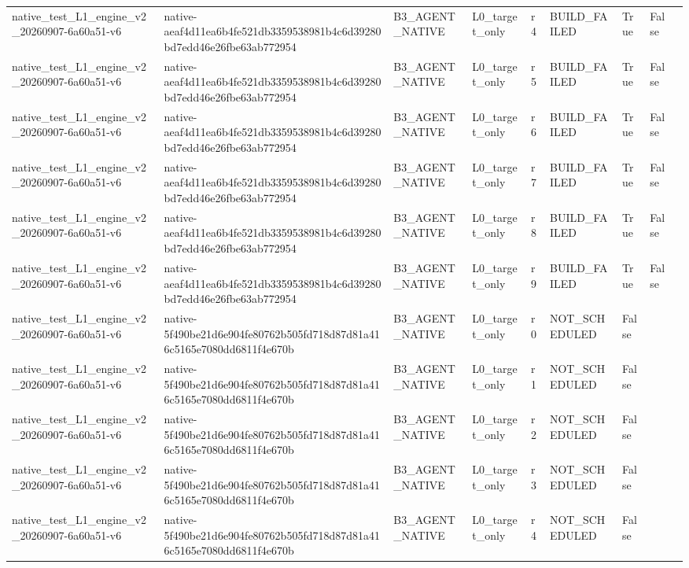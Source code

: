 \begin{tabular}{lllllllll}
native\_test\_L1\_engine\_v2\_20260907-6a60a51-v6 & native-aeaf4d11ea6b4fe521db3359538981b4c6d39280bd7edd46e26fbe63ab772954 & B3\_AGENT\_NATIVE & L0\_target\_only & r4 & BUILD\_FAILED & True & False &  \\
native\_test\_L1\_engine\_v2\_20260907-6a60a51-v6 & native-aeaf4d11ea6b4fe521db3359538981b4c6d39280bd7edd46e26fbe63ab772954 & B3\_AGENT\_NATIVE & L0\_target\_only & r5 & BUILD\_FAILED & True & False &  \\
native\_test\_L1\_engine\_v2\_20260907-6a60a51-v6 & native-aeaf4d11ea6b4fe521db3359538981b4c6d39280bd7edd46e26fbe63ab772954 & B3\_AGENT\_NATIVE & L0\_target\_only & r6 & BUILD\_FAILED & True & False &  \\
native\_test\_L1\_engine\_v2\_20260907-6a60a51-v6 & native-aeaf4d11ea6b4fe521db3359538981b4c6d39280bd7edd46e26fbe63ab772954 & B3\_AGENT\_NATIVE & L0\_target\_only & r7 & BUILD\_FAILED & True & False &  \\
native\_test\_L1\_engine\_v2\_20260907-6a60a51-v6 & native-aeaf4d11ea6b4fe521db3359538981b4c6d39280bd7edd46e26fbe63ab772954 & B3\_AGENT\_NATIVE & L0\_target\_only & r8 & BUILD\_FAILED & True & False &  \\
native\_test\_L1\_engine\_v2\_20260907-6a60a51-v6 & native-aeaf4d11ea6b4fe521db3359538981b4c6d39280bd7edd46e26fbe63ab772954 & B3\_AGENT\_NATIVE & L0\_target\_only & r9 & BUILD\_FAILED & True & False &  \\
native\_test\_L1\_engine\_v2\_20260907-6a60a51-v6 & native-5f490be21d6e904fe80762b505fd718d87d81a416c5165e7080dd6811f4e670b & B3\_AGENT\_NATIVE & L0\_target\_only & r0 & NOT\_SCHEDULED & False &  &  \\
native\_test\_L1\_engine\_v2\_20260907-6a60a51-v6 & native-5f490be21d6e904fe80762b505fd718d87d81a416c5165e7080dd6811f4e670b & B3\_AGENT\_NATIVE & L0\_target\_only & r1 & NOT\_SCHEDULED & False &  &  \\
native\_test\_L1\_engine\_v2\_20260907-6a60a51-v6 & native-5f490be21d6e904fe80762b505fd718d87d81a416c5165e7080dd6811f4e670b & B3\_AGENT\_NATIVE & L0\_target\_only & r2 & NOT\_SCHEDULED & False &  &  \\
native\_test\_L1\_engine\_v2\_20260907-6a60a51-v6 & native-5f490be21d6e904fe80762b505fd718d87d81a416c5165e7080dd6811f4e670b & B3\_AGENT\_NATIVE & L0\_target\_only & r3 & NOT\_SCHEDULED & False &  &  \\
native\_test\_L1\_engine\_v2\_20260907-6a60a51-v6 & native-5f490be21d6e904fe80762b505fd718d87d81a416c5165e7080dd6811f4e670b & B3\_AGENT\_NATIVE & L0\_target\_only & r4 & NOT\_SCHEDULED & False &  &  \\

\end{tabular}
